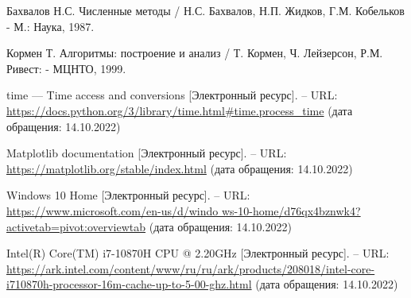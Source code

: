 
\renewcommand\bibname{Список использованных источников}
\begin{thebibliography}{}
 Бахвалов Н.С. Численные методы / Н.С. Бахвалов, Н.П. Жидков, Г.М. Кобельков - М.: Наука, 1987.

 Кормен Т. Алгоритмы: построение и анализ / Т. Кормен, Ч. Лейзерсон, Р.М. Ривест: - МЦНТО, 1999.

 time — Time access and conversions [Электронный ресурс]. -- URL: \url{https://docs.python.org/3/library/time.html#time.process_time} (дата обращения: 14.10.2022)

 Matplotlib documentation [Электронный ресурс]. -- URL: \url{https://matplotlib.org/stable/index.html} (дата обращения: 14.10.2022)

 Windows 10 Home [Электронный ресурс]. -- URL: \url{https://www.microsoft.com/en-us/d/windo ws-10-home/d76qx4bznwk4?activetab=pivot:overviewtab} (дата обращения: 14.10.2022)

 Intel(R) Core(TM) i7-10870H CPU @ 2.20GHz [Электронный ресурс]. -- URL: \url{https://ark.intel.com/content/www/ru/ru/ark/products/208018/intel-core-i710870h-processor-16m-cache-up-to-5-00-ghz.html} (дата обращения: 14.10.2022)

\end{thebibliography}